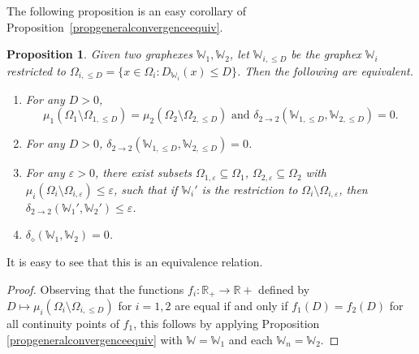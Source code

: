 \documentclass{amsart}
\numberwithin{equation}{section}
\numberwithin{figure}{section}
\newtheorem{proposition}[theorem]{Proposition}
\theoremstyle{definition}
\theoremstyle{remark}
\newcommand{\RR}{\mathbb{R}}
\newcommand{\cW}{\mathbb{W}}
\newcommand{\deltt}{\delta_{2\to 2}}
\def\delGP{\delta_\diamond}
\begin{document}
The following proposition is an easy corollary of
Proposition~\ref{propgeneralconvergenceequiv}.

\begin{proposition} \label{propequivgraphexes}
Given two graphexes $\cW_1,\cW_2$, let $\cW_{i,{\leq D}}$ be the graphex
$\cW_i$ restricted to $\Omega_{i,\leq D}=\{x \in \Omega_i: D_{\cW_i}(x) \le
D\}$. Then the following are equivalent.
\begin{enumerate}
\item \label{graphexequiveachDsameboth} For any $D>0$,
    \[\mu_{{1}}(\Omega_1\setminus\Omega_{1,{\leq
    D}})=\mu_{{2}}(\Omega_2\setminus\Omega_{2,{\leq D}})\text{ and }
 \deltt(\cW_{1,{\leq D}},\cW_{2,{\leq D}})=0.\]
\item For any $D>0$, $\deltt(\cW_{1,{\leq D}},\cW_{2,{\leq D}})=0$.
    \label{graphexequiveachDsame}
\item For any $\varepsilon>0$, there exist subsets $\Omega_{1,\varepsilon}
    \subseteq \Omega_1$, $\Omega_{2,\varepsilon} \subseteq \Omega_2$ with
$\mu_{{i}}(\Omega_i \setminus \Omega_{i,\varepsilon}) \le \varepsilon$,
such that if $\cW_i'$ is the restriction to $\Omega_i \setminus
\Omega_{i,\varepsilon}$, then $\deltt(\cW_1',\cW_2') \le \varepsilon$.
\label{graphexequivepsilonD}
\item $\delGP(\cW_1,\cW_2)=0$. \label{graphexequivonlyepsilon}
\end{enumerate}
\end{proposition}

It is easy to see that this is an equivalence relation.

\begin{proof}
Observing that the functions $f_i\colon\RR_+\to\RR+$ defined by
$D\mapsto\mu_i(\Omega_i\setminus\Omega_{i,\leq D})$ for $i=1,2$ are equal if
and only if $f_1(D)=f_2(D)$ for all continuity points of $f_1$, this follows
by applying Proposition \ref{propgeneralconvergenceequiv} with $\cW=\cW_1$
and each $\cW_n=\cW_2$.
\end{proof}
\end{document}

